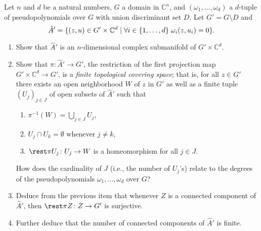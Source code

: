 \documentclass[a4paper]{amsart}
\newcommand{\C}{\mathbb{C}}
\theoremstyle{remark}
\numberwithin{equation}{question}
\DeclarePairedDelimiter\set{\{}{\}}
\begin{document}
\begin{question}[subtitle={Generalizing the theorem on branched coverings}]
\label{qu:covering space}
Let $n$ and $d$ be a natural numbers, $G$ a domain in $\C^n$, and $(\omega_1,\dots,\omega_d)$ a $d$-tuple of pseudopolynomials over $G$ with union discriminant set $D$. Let $G' = G \setminus D$ and
\[
\hat A' = \set{(z,u) \in G' \times \C^d \mid \forall i \in \set{1,\dots,d} \; \omega_i(z,u_i) = 0}.
\]
\begin{enumerate}
\item\label{it:covering space-a} Show that $\hat A'$ is an $n$-dimensional complex submanifold of $G' \times \C^d$.
\item\label{it:covering space-b} Show that $\pi \colon \hat A' \to G'$, the restriction of the first projection map $G' \times \C^d \to G'$, is a \emph{finite topological covering space}; that is, for all $z \in G'$ there exists an open neighborhood $W$ of $z$ in $G'$ as well as a finite tuple $(U_j)_{j \in J}$ of open subsets of $\hat A'$ such that
\begin{enumerate}
\item $\pi^{-1}(W) = \bigcup_{j \in J} U_j$,
\item $U_j \cap U_k = \emptyset$ whenever $j \ne k$,
\item $\rest\pi{U_j} \colon U_j \to W$ is a homeomorphism for all $j \in J$.
\end{enumerate}

How does the cardinality of $J$ (i.e., the number of $U_j$'s) relate to the degrees of the pseudopolynomials $\omega_1,\dots,\omega_d$ over $G$?
\item\label{it:covering space-c} Deduce from the previous item that whenever $Z$ is a connected component of $\hat A'$, then $\rest\pi Z \colon Z \to G'$ is surjective.
\item Further deduce that the number of connected components of $\hat A'$ is finite.
\end{enumerate}
\end{question}
\end{document}
